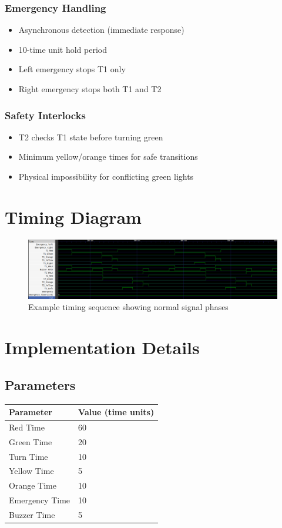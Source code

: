 \documentclass{article}
\begin{document}
\subsubsection{Emergency Handling}
\begin{itemize}
    \item Asynchronous detection (immediate response)
    \item 10-time unit hold period
    \item Left emergency stops T1 only
    \item Right emergency stops both T1 and T2
\end{itemize}

\subsubsection{Safety Interlocks}
\begin{itemize}
    \item T2 checks T1 state before turning green
    \item Minimum yellow/orange times for safe transitions
    \item Physical impossibility for conflicting green lights
\end{itemize}

\section{Timing Diagram}
\begin{figure}[H]
\centering
\includegraphics[width=\textwidth]{figs/test.png}
\caption{Example timing sequence showing normal signal phases}
\end{figure}


\section{Implementation Details}

\subsection{Parameters}
\begin{tabular}{|l|l|}
\hline
Parameter & Value (time units) \\
\hline
Red Time & 60 \\
Green Time & 20 \\
Turn Time & 10 \\
Yellow Time & 5 \\
Orange Time & 10 \\
Emergency Time & 10 \\
Buzzer Time & 5 \\
\hline
\end{tabular}
\end{document}
